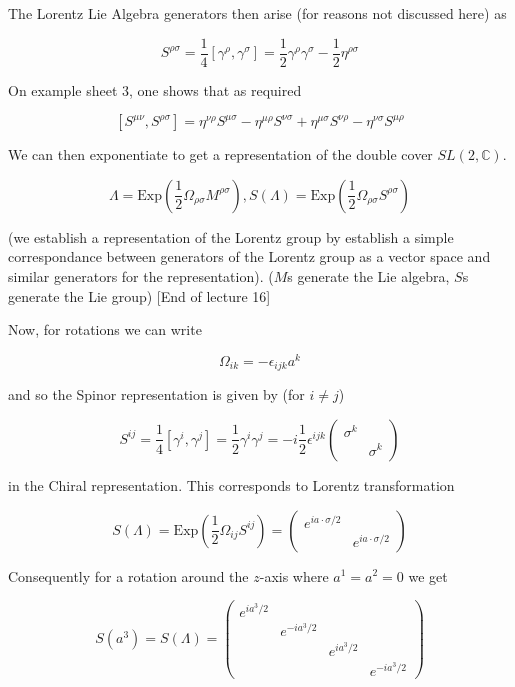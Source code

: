 \documentclass{article}
\theoremstyle{definition}
\begin{document}
The Lorentz Lie Algebra generators then arise (for reasons not discussed here)
as

$$ S^{\rho \sigma} = \frac{1}{4} [\gamma^\rho, \gamma^\sigma] = \frac{1}{2}
\gamma^\rho \gamma^\sigma - \frac{1}{2} \eta^{\rho \sigma} $$

On example sheet 3, one shows that as required

$$ [S^{\mu \nu}, S^{\rho \sigma}] = \eta^{\nu \rho} S^{\mu \sigma} - \eta^{\mu
  \rho} S^{\nu \sigma} + \eta^{\mu \sigma} S^{\nu \rho} - \eta^{\nu \sigma}
S^{\mu \rho} $$

We can then exponentiate to get a representation of the double cover $SL(2,
\mathbb{C})$.

$$ \Lambda = \text{Exp}(\frac{1}{2} \Omega_{\rho \sigma} M^{\rho \sigma}),
S(\Lambda) = \text{Exp}(\frac{1}{2} \Omega_{\rho \sigma} S^{\rho \sigma}) $$

(we establish a representation of the Lorentz group by establish a simple
correspondance between generators of the Lorentz group as a vector space and
similar generators for the representation). ($M$s generate the Lie algebra, $S$s
generate the Lie group) [End of lecture 16]

Now, for rotations we can write

$$ \Omega_{ik} = -\epsilon_{ijk} a^k $$

and so the Spinor representation is given by (for $i \neq j$)

$$ S^{ij} = \frac{1}{4} [\gamma^i, \gamma^j] = \frac{1}{2} \gamma^i \gamma^j =
-i \frac{1}{2} \epsilon^{ijk}
\begin{pmatrix}
  \sigma^k & \\
  & \sigma^k
\end{pmatrix}
$$

in the Chiral representation. This corresponds to Lorentz transformation

$$ S(\Lambda) = \text{Exp} (\frac{1}{2} \Omega_{ij} S^{ij}) =
\begin{pmatrix}
  e^{ia \cdot \sigma / 2} & \\
  & e^{ia \cdot \sigma / 2}
\end{pmatrix}
$$

Consequently for a rotation around the $z$-axis where $a^1 = a^2 = 0$ we get

$$ S(a^3) = S(\Lambda) =
\begin{pmatrix}
  e^{i a^3 / 2} & & & \\
  & e^{-ia^3 / 2} & & \\
  & & e^{i a^3 / 2} & \\
  & & & e^{-ia^3 / 2}
\end{pmatrix} $$
\end{document}
